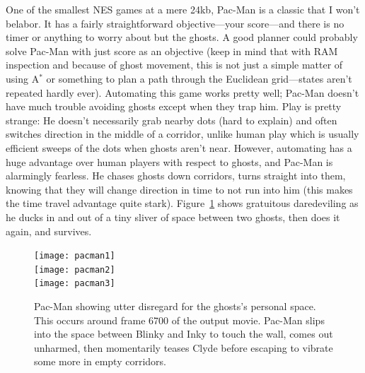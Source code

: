 \documentclass[twocolumn]{article}
\begin{document}
One of the smallest NES games at a mere 24kb, Pac-Man is a classic
that I won't belabor. It has a fairly straightforward objective---your
score---and there is no timer or anything to worry about but the
ghosts. A good planner could probably solve Pac-Man with just score as
an objective (keep in mind that with RAM inspection and because of
ghost movement, this is not just a simple matter of using A$^{*}$ or
something to plan a path through the Euclidean grid---states aren't
repeated hardly ever). Automating this game works pretty well; Pac-Man
doesn't have much trouble avoiding ghosts except when they trap him.
Play is pretty strange: He doesn't necessarily grab nearby dots (hard
to explain) and often switches direction in the middle of a corridor,
unlike human play which is usually efficient sweeps of the dots when
ghosts aren't near. However, automating has a huge advantage over
human players with respect to ghosts, and Pac-Man is alarmingly
fearless. He chases ghosts down corridors, turns straight into them,
knowing that they will change direction in time to not run into him
(this makes the time travel advantage quite stark).
Figure~\ref{fig:pacman} shows gratuitous daredeviling as he ducks in
and out of a tiny sliver of space between two ghosts, then does it
again, and survives.

\begin{figure}[ht]
\begin{center}
\texttt{[image: pacman1]} \\[0.3em]
\texttt{[image: pacman2]} \\[0.3em]
\texttt{[image: pacman3]}
\end{center}\vspace{-0.1in}
\caption{Pac-Man showing utter disregard for the ghosts's personal
  space. This occurs around frame 6700 of the output movie. Pac-Man
  slips into the space between Blinky and Inky to touch the wall,
  comes out unharmed, then momentarily teases Clyde before escaping
  to vibrate some more in empty corridors.}
\label{fig:pacman}
\end{figure}
\end{document}
